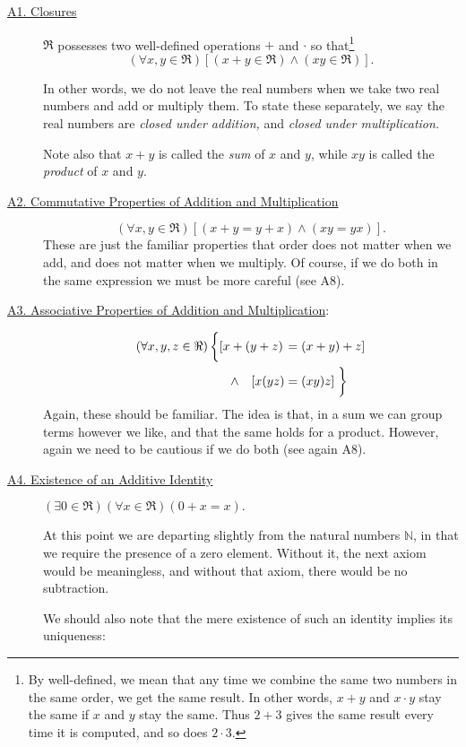 \begin{description}
%
\item[\ul{A1.\vphantom{g} Closures}] $\Re$ possesses two well-defined
operations $+$ and $\cdot$ so that\footnote{%
By well-defined, we mean that any time we combine the same
two numbers in the same order, we get the same result.
In other words, $x+y$ and $x\cdot y$ stay the same if $x$ and $y$
stay the same.  Thus $2+3$ gives the same result every time
it is computed, and so does $2\cdot3$.
} 
$$(\forall x,y\in\Re) [(x+y\in\Re)\wedge(x y\in\Re)].$$
 
In other words, we do not leave the real numbers when we
take two real numbers and add or multiply them.
To state these separately, we say the real numbers are
{\it closed under addition,}  and {\it closed under multiplication.} 

Note also that $x+y$ is called the {\it sum} of $x$ and $y$,
while $xy$ is called the {\it product} of $x$ and $y$.

\item[\ul{A2. Commutative Properties of Addition
and Multiplication}] $$(\forall x,y\in\Re) 
[(x+y=y+x)\wedge(xy=yx)].$$ 
These are just the familiar properties that order does not
matter when we add, and does not matter when we multiply.
Of course, if we do both in the same expression we must be
more careful (see A8).
\item[\ul{A3. Associative Properties of Addition and Multiplication}:]
\begin{align*}
(\forall x,y,z\in\Re)
\left\{\vphantom{\frac12}
 [x+(y+z)\right.&=(x+y)+z]\\ 
\wedge\quad [x(yz)&=(xy)z]\left.\vphantom{\frac12}\right\}
\end{align*}  
Again, these should be familiar.  The idea is that, in a sum
we can group terms however we like, and that the same holds for
a product.  However, again we need to be cautious if we do both
(see again  A8).
\item[\ul{A4. Existence of an Additive Identity}] 
$(\exists0\in\Re)(\forall x\in\Re)(0+x=x).$

At this point we are departing slightly from the natural numbers
$\mathbb{N}$, in that we require the presence of a zero element.
Without it, the next axiom would be meaningless, and without that
axiom, there would be no subtraction.

We should also note that the mere existence of such an identity
implies its uniqueness:
\end{description}
